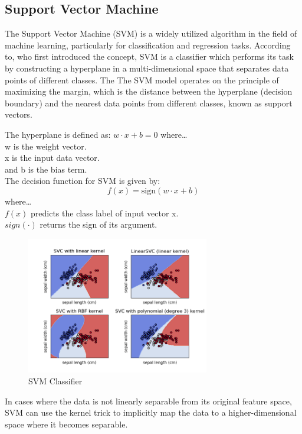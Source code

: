 \documentclass[12pt]{report}
\begin{document}
\subsection*{Support Vector Machine}
The Support Vector Machine (SVM) is a widely utilized algorithm in the field of
machine learning, particularly for classification and regression tasks.
According to\cite{Cortes1995}, who first introduced the concept, SVM is a
classifier which performs its task by constructing a hyperplane in a
multi-dimensional space that separates data points of different classes. The
The SVM model operates on the principle of maximizing the margin, which is the
distance between the hyperplane (decision boundary) and the nearest data points
from different classes, known as support vectors.

The hyperplane is defined as: \( w \cdot x + b = 0 \) where\dots\\ w is the
weight vector.\\ x is the input data vector.\\ and b is the bias term.\\

The decision function for SVM is given by: \[ f(x)=\mathrm{sign}(w \cdot x + b) \] where\dots \\ $f(x)$ predicts the class label of input vector x.\\
$sign(\cdot)$ returns the sign of its argument.\\

\begin{figure}[ht]
      \centering
      \includegraphics[width=8cm]{./figures/images (4).png}
      \caption{SVM Classifier}\label{fig:fig1}
\end{figure}

In cases where the data is not linearly separable from its original feature
space, SVM can use the kernel trick to implicitly map the data to a
higher-dimensional space where it becomes separable.
\end{document}
